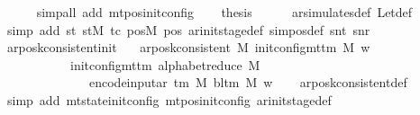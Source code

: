 \begin{isabellebody}
\ \ \ \ \isamarkupfalse%
\ {\isacharparenleft}{\kern0pt}simp{\isacharunderscore}{\kern0pt}all\ add{\isacharcolon}{\kern0pt}\ mt{\isacharunderscore}{\kern0pt}pos{\isacharunderscore}{\kern0pt}init{\isacharunderscore}{\kern0pt}config{\isacharparenright}{\kern0pt}\isanewline
\ \ \isamarkupfalse%
\ {\isacharquery}{\kern0pt}thesis\isanewline
\ \ \ \ \isamarkupfalse%
\ ar{\isacharunderscore}{\kern0pt}simulates{\isacharunderscore}{\kern0pt}def\ Let{\isacharunderscore}{\kern0pt}def\isanewline
\ \ \ \ \isamarkupfalse%
\ {\isacharparenleft}{\kern0pt}simp\ add{\isacharcolon}{\kern0pt}\ st\ stM\ tc\ posM\ pos{\isacharprime}{\kern0pt}\ ar{\isacharunderscore}{\kern0pt}init{\isacharunderscore}{\kern0pt}stage{\isacharunderscore}{\kern0pt}def\ sim{\isacharunderscore}{\kern0pt}pos{\isacharunderscore}{\kern0pt}def\ snt\ snr{\isacharparenright}{\kern0pt}\isanewline
{}\isamarkupfalse%
%
\endisatagproof
{\isafoldproof}%
%
\isadelimproof
\isanewline
%
\endisadelimproof
\isanewline
{}\isamarkupfalse%
\ ar{\isacharunderscore}{\kern0pt}posk{\isacharunderscore}{\kern0pt}consistent{\isacharunderscore}{\kern0pt}init{\isacharcolon}{\kern0pt}\isanewline
\ \ \ {\isachardoublequoteopen}ar{\isacharunderscore}{\kern0pt}posk{\isacharunderscore}{\kern0pt}consistent\ M\ {\isacharparenleft}{\kern0pt}init{\isacharunderscore}{\kern0pt}config{\isacharunderscore}{\kern0pt}mttm\ M\ w{\isacharparenright}{\kern0pt}\isanewline
\ \ \ \ \ \ \ \ \ \ \ {\isacharparenleft}{\kern0pt}init{\isacharunderscore}{\kern0pt}config{\isacharunderscore}{\kern0pt}mttm\ {\isacharparenleft}{\kern0pt}alphabet{\isacharunderscore}{\kern0pt}reduce\ M{\isacharparenright}{\kern0pt}\isanewline
\ \ \ \ \ \ \ \ \ \ \ \ \ \ {\isacharparenleft}{\kern0pt}encode{\isacharunderscore}{\kern0pt}input{\isacharunderscore}{\kern0pt}ar\ {\isacharparenleft}{\kern0pt}{\isasymGamma}{\isacharunderscore}{\kern0pt}tm\ M{\isacharparenright}{\kern0pt}\ {\isacharparenleft}{\kern0pt}bl{\isacharunderscore}{\kern0pt}tm\ M{\isacharparenright}{\kern0pt}\ w{\isacharparenright}{\kern0pt}{\isacharparenright}{\kern0pt}{\isachardoublequoteclose}\isanewline
%
\isadelimproof
\ \ %
\endisadelimproof
%
\isatagproof
{}\isamarkupfalse%
\ ar{\isacharunderscore}{\kern0pt}posk{\isacharunderscore}{\kern0pt}consistent{\isacharunderscore}{\kern0pt}def\isanewline
\ \ \isamarkupfalse%
\ {\isacharparenleft}{\kern0pt}simp\ add{\isacharcolon}{\kern0pt}\ mt{\isacharunderscore}{\kern0pt}state{\isacharunderscore}{\kern0pt}init{\isacharunderscore}{\kern0pt}config\ mt{\isacharunderscore}{\kern0pt}pos{\isacharunderscore}{\kern0pt}init{\isacharunderscore}{\kern0pt}config\ ar{\isacharunderscore}{\kern0pt}init{\isacharunderscore}{\kern0pt}stage{\isacharunderscore}{\kern0pt}def{\isacharparenright}{\kern0pt}%

\end{isabellebody}
